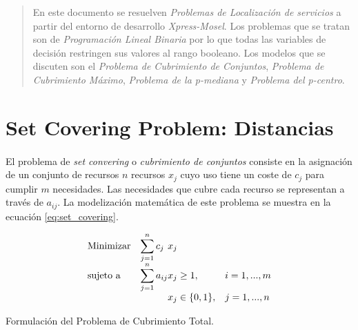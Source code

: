 \documentclass[spanish]{article}
\begin{document}
	\maketitle %

	\thispagestyle{fancy} %



	\begin{abstract}
		\noindent En este documento se resuelven \emph{Problemas de Localización de servicios} a partir del entorno de desarrollo \emph{Xpress-Mosel}\cite{tool:xpress-mosel}. Los problemas que se tratan son de \emph{Programación Lineal Binaria} por lo que todas las variables de decisión restringen sus valores al rango booleano. Los modelos que se discuten son el \emph{Problema de Cubrimiento de Conjuntos}, \emph{Problema de Cubrimiento Máximo}, \emph{Problema de la p-mediana} y \emph{Problema del p-centro}.
	\end{abstract}



  \section{Set Covering Problem: Distancias}
	\label{sec:1}

    \paragraph{}
		El problema de \emph{set convering} o \emph{cubrimiento de conjuntos} consiste en la asignación de un conjunto de recursos $n$ recursos $x_{j}$ cuyo uso tiene un coste de $c_{j}$ para cumplir $m$ necesidades. Las necesidades que cubre cada recurso se representan a través de $a_{ij}$. La modelización matemática de este problema se muestra en la ecuación \eqref{eq:set_covering}.


		\begin{eqfloat}
			\begin{equation}
				\begin{array}{ll@{}ll}
					\text{Minimizar}	& \displaystyle\sum\limits_{j=1}^{n} c_{j}	&	x_{j} &\\
					\text{sujeto a}		& \displaystyle\sum\limits_{j = 1}^n a_{ij}	&	x_{j} \geq 1,  &i=1 ,..., m\\
													 	&                                           &	x_{j} \in \{0,1\}, &j=1 ,..., n
				\end{array}
			\end{equation}
      \caption{Formulación del Problema de Cubrimiento Total.}
      \label{eq:set_covering}
    \end{eqfloat}
\end{document}
